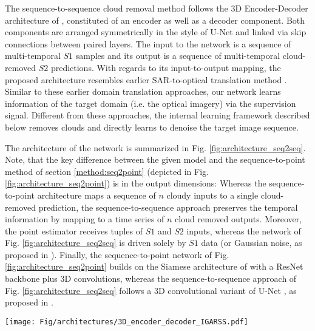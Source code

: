 \documentclass[journal]{IEEEtran}
\begin{document}
The sequence-to-sequence cloud removal method \cite{ebel2021seq2seq} follows the 3D Encoder-Decoder architecture of \cite{zhang2019internal}, constituted of an encoder as well as a decoder component. Both components are arranged symmetrically in the style of U-Net \cite{ronneberger2015u} and linked via skip connections between paired layers. The input to the network is a sequence of multi-temporal $S1$ samples and its output is a sequence of multi-temporal cloud-removed $S2$ predictions. With regards to its input-to-output mapping, the proposed architecture resembles earlier SAR-to-optical translation method  \cite{Fuentes_Reyes_Auer_Merkle_Henry_Schmitt_2019, wang2019sar}. Similar to these earlier domain translation approaches, our network learns information of the target domain (i.e. the optical imagery) via the supervision signal. Different from these approaches, the internal learning framework described below removes clouds and directly learns to denoise the target image sequence.

The architecture of the network is summarized in Fig. \ref{fig:architecture_seq2seq}. Note, that the key difference between the given model and the sequence-to-point method of section \ref{method:seq2point} (depicted in Fig. \ref{fig:architecture_seq2point}) is in the output dimensions: Whereas the sequence-to-point architecture maps a sequence of $n$ cloudy inputs to a single cloud-removed prediction, the sequence-to-sequence approach preserves the temporal information by mapping to a time series of $n$ cloud removed outputs. Moreover, the point estimator receives tuples of $S1$ and $S2$ inputs, whereas the network of Fig. \ref{fig:architecture_seq2seq} is driven solely by $S1$ data (or Gaussian noise, as proposed in \cite{ulyanov2018deep, zhang2019internal}). Finally, the sequence-to-point network of Fig. \ref{fig:architecture_seq2point} builds on the Siamese architecture of \cite{Sarukkai_Jain_Uzkent_Ermon_2019} with a ResNet backbone \cite{meraner2020cloud} plus 3D convolutions, whereas the sequence-to-sequence approach of Fig. \ref{fig:architecture_seq2seq} follows a 3D convolutional variant of U-Net \cite{ronneberger2015u}, as proposed in \cite{zhang2019internal}.

\begin{figure*}[h!tb] \texttt{[image: Fig/architectures/3D\_encoder\_decoder\_IGARSS.pdf]}
    \caption{A conceptual illustration of the 3D Encoder-Decoder architecture $G_{seq2seq}$ employed in the sequence-to-sequence cloud removal model \cite{ebel2021seq2seq}. The network is based on the architecture of \cite{zhang2019internal} and consists of encoder and decoder parts arranged symmetrically in the style of U-Net \cite{ronneberger2015u}, with skip connections between paired layers. Input to the network is a batch of multi-temporal $S1$ observations. The output is a predicted batch of multi-temporal multi-spectral $S2$ observations. For the ablation model considered in section \ref{exp:seq2seq}, Gaussian noise is used as an input as in \cite{ulyanov2018deep, zhang2019internal}.}
    \label{fig:architecture_seq2seq}
\end{figure*}
\end{document}
